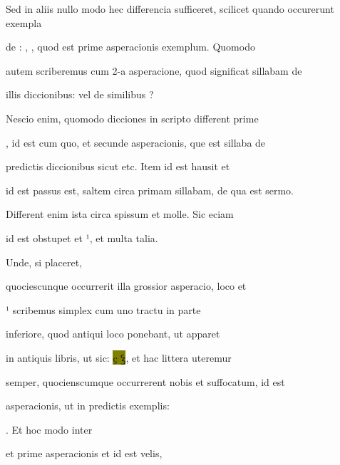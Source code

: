 Sed in aliis nullo modo hec differencia sufficeret, scilicet quando occurerunt exempla

de : , , quod est prime asperacionis exemplum. Quomodo

autem scriberemus  cum 2-a asperacione, quod significat sillabam de

illis diccionibus:    vel de similibus ?

Nescio enim, quomodo dicciones in scripto different  prime 

, id est cum quo, et  secunde asperacionis, que est sillaba de

predictis diccionibus sicut  etc. Item  id est hausit et

 id est passus est, saltem circa primam sillabam, de qua est sermo.

Different enim ista circa  spissum et molle. Sic eciam 

\splitlines

id est obstupet et ¹, et multa talia.

\indentK Unde, si placeret,

\fulllines

quociescunque occurrerit illa grossior asperacio,  loco  et

¹  scribemus simplex  cum uno tractu in parte

inferiore, quod antiqui loco  ponebant, ut apparet

in antiquis libris, ut sic: \colorbox{olive}{ç {\Quivira ꝣ}}, et hac littera uteremur

semper, quocienscumque occurrerent nobis   et  suffocatum, id est 

 asperacionis, ut in predictis exemplis:  

    . Et hoc modo inter 

et  prime asperacionis et  id est velis, 

